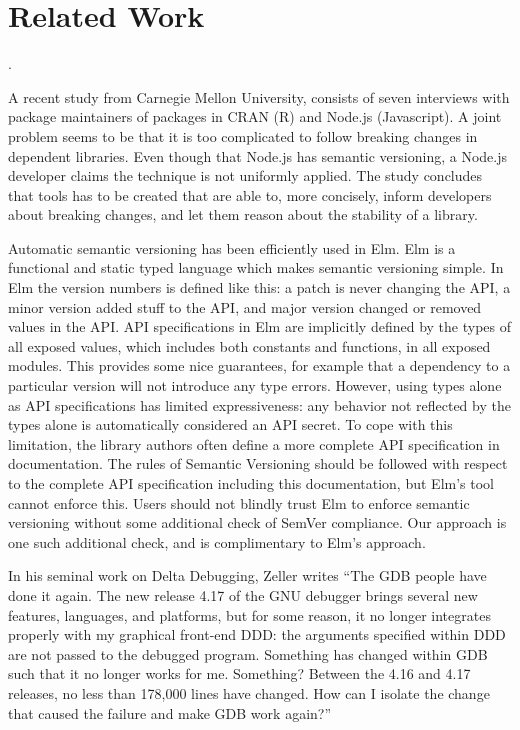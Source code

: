 \section{Related Work}

 \cite{Parnas}.

A recent study from Carnegie Mellon University\cite{bogart15-break}, consists of seven interviews
with package maintainers of packages in CRAN (R) and Node.js (Javascript). A
joint problem seems to be that it is too complicated to follow breaking changes
in dependent libraries. Even though that Node.js has semantic versioning, a
Node.js developer claims the technique is not uniformly applied. The study
concludes that tools has to be created that are able to, more concisely, inform
developers about breaking changes, and let them reason about the stability of a
library.

Automatic semantic versioning has been efficiently used in Elm. Elm is
a functional and static typed language which makes semantic versioning
simple. In Elm the version numbers is defined like this: a patch is
never changing the API, a minor version added stuff to the API, and
major version changed or removed values in the API. API specifications
in Elm are implicitly defined by the types of all exposed values,
which includes both constants and functions, in all exposed
modules. This provides some nice guarantees, for example that a
dependency to a particular version will not introduce any type
errors. However, using types alone as API specifications has limited
expressiveness: any behavior not reflected by the types alone is
automatically considered an API secret. To cope with this limitation,
the library authors often define a more complete API specification in
documentation. The rules of Semantic Versioning should be followed
with respect to the complete API specification including this
documentation, but Elm's tool cannot enforce this. Users should not
blindly trust Elm to enforce semantic versioning without some
additional check of SemVer compliance. Our approach is one such
additional check, and is complimentary to Elm's approach.

In his seminal work on Delta Debugging, Zeller writes ``The GDB people have done
it again. The new release 4.17 of the GNU debugger brings several new features,
languages, and platforms, but for some reason, it no longer integrates properly
with my graphical front-end DDD: the arguments specified within DDD are not
passed to the debugged program. Something has changed within GDB such that it
no longer works for me. Something? Between the 4.16 and 4.17 releases, no less
than 178,000 lines have changed. How can I isolate the change that caused the
failure and make GDB work again?''

